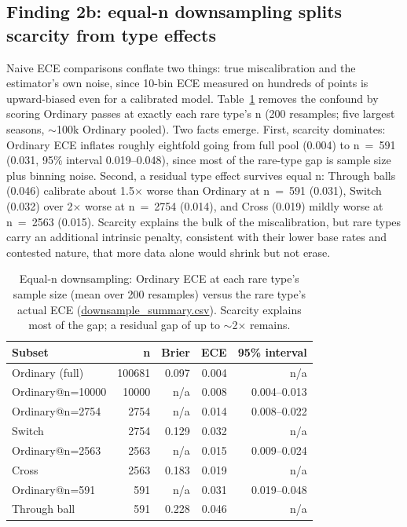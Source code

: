 \documentclass[11pt,a4paper]{article}
\begin{document}
\subsection{Finding 2b: equal-n downsampling splits scarcity from type effects}
Naive ECE comparisons conflate two things: true miscalibration and the
estimator's own noise, since 10-bin ECE measured on hundreds of points is
upward-biased even for a calibrated model. Table~\ref{tab:down} removes
the confound by scoring Ordinary passes at exactly each rare type's n
(200 resamples; five largest seasons, $\sim$100k Ordinary pooled).
Two facts emerge. First, scarcity dominates: Ordinary ECE inflates roughly
eightfold going from full pool (0.004) to n~=~591 (0.031, 95\% interval
0.019--0.048), since most of the rare-type gap is sample size plus binning
noise. Second, a residual type effect survives equal n: Through balls
(0.046) calibrate about 1.5$\times$ worse than Ordinary at n~=~591
(0.031), Switch (0.032) over 2$\times$ worse at n~=~2754 (0.014), and
Cross (0.019) mildly worse at n~=~2563 (0.015). Scarcity explains the bulk of the
miscalibration, but rare types carry an additional intrinsic penalty,
consistent with their lower base rates and contested nature, that more
data alone would shrink but not erase.
\begin{table}[h]
\centering
\begin{tabular}{lrrrr}
\toprule
Subset & n & Brier & ECE & 95\% interval \\
\midrule
Ordinary (full) & 100681 & 0.097 & 0.004 & n/a \\
Ordinary@n=10000 & 10000 & n/a & 0.008 & 0.004--0.013 \\
Ordinary@n=2754 & 2754 & n/a & 0.014 & 0.008--0.022 \\
Switch & 2754 & 0.129 & 0.032 & n/a \\
Ordinary@n=2563 & 2563 & n/a & 0.015 & 0.009--0.024 \\
Cross & 2563 & 0.183 & 0.019 & n/a \\
Ordinary@n=591 & 591 & n/a & 0.031 & 0.019--0.048 \\
Through ball & 591 & 0.228 & 0.046 & n/a \\
\bottomrule
\end{tabular}
\caption{Equal-n downsampling: Ordinary ECE at each rare type's sample size
(mean over 200 resamples) versus the rare type's actual ECE
(\url{downsample_summary.csv}). Scarcity explains most of the gap; a residual gap of up to $\sim$2$\times$ remains.}
\label{tab:down}
\end{table}
\end{document}
